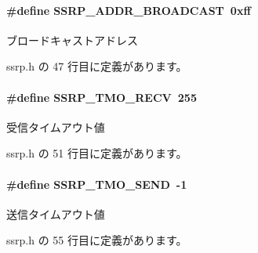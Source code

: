 \paragraph[{S\+S\+R\+P\+\_\+\+A\+D\+D\+R\+\_\+\+B\+R\+O\+A\+D\+C\+A\+S\+T}]{\setlength{\rightskip}{0pt plus 5cm}\#define S\+S\+R\+P\+\_\+\+A\+D\+D\+R\+\_\+\+B\+R\+O\+A\+D\+C\+A\+S\+T~0xff}\label{ssrp_8h_a45cf2a260877004832aef2829f84d90d_a45cf2a260877004832aef2829f84d90d}


ブロードキャストアドレス 



 ssrp.\+h の 47 行目に定義があります。

\paragraph[{S\+S\+R\+P\+\_\+\+T\+M\+O\+\_\+\+R\+E\+C\+V}]{\setlength{\rightskip}{0pt plus 5cm}\#define S\+S\+R\+P\+\_\+\+T\+M\+O\+\_\+\+R\+E\+C\+V~255}\label{ssrp_8h_a8ab83c225d7e98ee20fecf775e415082_a8ab83c225d7e98ee20fecf775e415082}


受信タイムアウト値 



 ssrp.\+h の 51 行目に定義があります。

\paragraph[{S\+S\+R\+P\+\_\+\+T\+M\+O\+\_\+\+S\+E\+N\+D}]{\setlength{\rightskip}{0pt plus 5cm}\#define S\+S\+R\+P\+\_\+\+T\+M\+O\+\_\+\+S\+E\+N\+D~-\/1}\label{ssrp_8h_a4ebcd371d2939b092bcf3669f8516dbd_a4ebcd371d2939b092bcf3669f8516dbd}


送信タイムアウト値 



 ssrp.\+h の 55 行目に定義があります。

